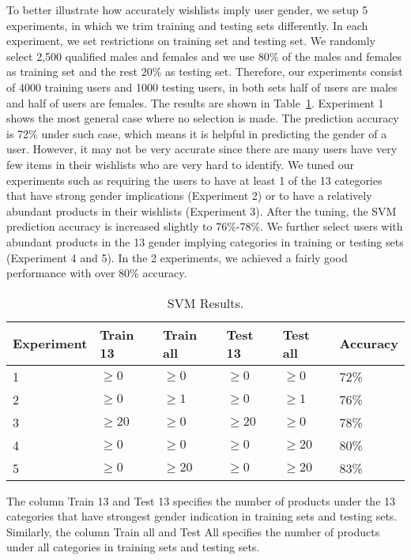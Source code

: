 To better illustrate how accurately wishlists imply user gender, we setup 5 experiments, in which we trim training and testing sets differently. In each experiment, we set restrictions on training set and testing set. We randomly select 2,500 qualified males and females and we use 80\% of the males and females as training set and the rest 20\% as testing set. Therefore, our experiments consist of 4000 training users and 1000 testing users, in both sets half of users are males and half of users are females. The results are shown in Table~\ref{tb:svm}. Experiment 1 shows the most general case where no selection is made. The prediction accuracy is 72\% under such case, which means it is helpful in predicting the gender of a user. However, it may not be very accurate since there are many users have very few items in their wishlists who are very hard to identify. We tuned our experiments such as requiring the users to have at least 1 of the 13 categories that have strong gender implications (Experiment 2) or to have a relatively abundant products in their wishlists (Experiment 3). After the tuning, the SVM prediction accuracy is increased slightly to 76\%-78\%. We further select users with abundant products in the 13 gender implying categories in training or testing sets (Experiment 4 and 5). In the 2 experiments, we achieved a fairly good performance with over 80\% accuracy. 


\begin{table}[t]
    \begin{adjustbox}{max width=.5\textwidth}
  \begin{threeparttable}
    \caption{SVM Results.}
    \label{tb:svm}
     \begin{tabular}{llllll}
        Experiment &Train 13 & Train all & Test 13 & Test all & Accuracy \\ \hline
		1&$\ge 0$ & $\ge 0$ & $\ge 0$ & $\ge 0$ & 72\% \\
		2&$\ge 0$ & $\ge 1$ & $\ge 0$ & $\ge 1$ & 76\% \\
		3&$\ge 20$ & $\ge 0$ & $\ge 20$ & $\ge 0$ & 78\% \\
		4&$\ge 0$ & $\ge 0$ & $\ge 0$ & $\ge 20$ & 80\% \\
		5&$\ge 0$ & $\ge 20$ & $\ge 0$ & $\ge 20$ & 83\% \\
     \end{tabular}
    \begin{tablenotes}
      \small
      \item The column Train 13 and Test 13 specifies the number of products under the 13 categories that have strongest gender indication in training sets and testing sets. Similarly, the column Train all and Test All specifies the number of products under all categories in training sets and testing sets.
    \end{tablenotes}
  \end{threeparttable}
  \end{adjustbox}
\end{table}


